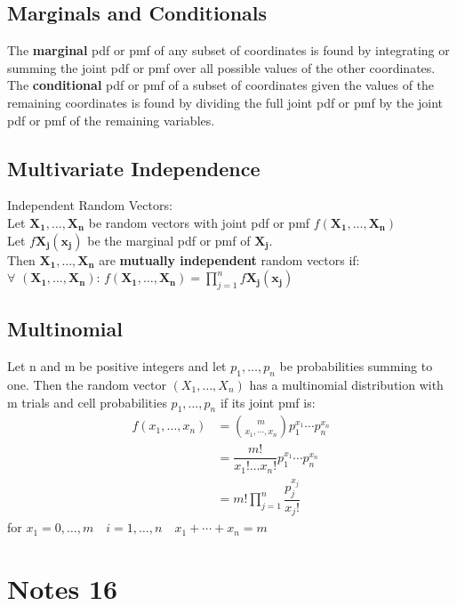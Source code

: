 \documentclass[openany]{book}
\begin{document}
\section{Marginals and Conditionals}
The \textbf{marginal} pdf or pmf of any subset of coordinates is found by integrating or summing the joint pdf or pmf over all possible values of the other coordinates.\medbreak
The \textbf{conditional} pdf or pmf of a subset of coordinates given the values of the remaining coordinates is found by dividing the full joint pdf or pmf by the joint pdf or pmf of the remaining variables.
\section{Multivariate Independence}
Independent Random Vectors:\\
Let $\boldsymbol{X_1},\dots,\boldsymbol{X_n}$ be random vectors with joint pdf or pmf $f(\boldsymbol{X_1},\dots,\boldsymbol{X_n})$\\
Let $f\boldsymbol{X_j}(\boldsymbol{x_j})$ be the marginal pdf or pmf of $\boldsymbol{X_j}$.\\
Then $\boldsymbol{X_1},\dots,\boldsymbol{X_n}$ are \textbf{mutually independent} random vectors if:\\
$\forall$ $(\boldsymbol{X_1},\dots,\boldsymbol{X_n})$: \quad  $f(\boldsymbol{X_1},\dots,\boldsymbol{X_n})=\prod_{j=1}^{n}f\boldsymbol{X_j}(\boldsymbol{x_j})$
\section{Multinomial}
Let n and m be positive integers and let $p_1,\dots,p_n$ be probabilities summing to one. Then the random vector $(X_1,\dots,X_n)$ has a multinomial distribution with m trials and cell probabilities $p_1,\dots,p_n$ if its joint pmf is:
\begin{align*}
f(x_1,\dots,x_n)&={m \choose x_1,\cdots,x_n} p_1^{x_1}\cdots p_n^{x_n}\\
&=\dfrac{m!}{x_1! \dots x_n!}p_1^{x_1}\cdots p_n^{x_n}\\
&= m!\prod_{j=1}^{n}\dfrac{p_j^{x_j}}{x_j!}
\end{align*}
for $x_1=0,\dots,m \quad i=1,\dots,n \quad x_1+\cdots+x_n=m$
\chapter{Notes 16}
\end{document}
